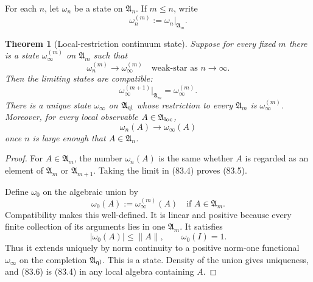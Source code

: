 \documentclass[11pt]{article}
\newtheorem{theorem}{Theorem}[section]
\theoremstyle{remark}
\begin{document}
For each \(n\), let \(\omega_n\) be a state on
\({\mathfrak A}_n\).  If \(m\leq n\), write
\[
                         \omega_n^{(m)}
 :=\omega_n|_{{\mathfrak A}_m}.                              \tag{83.3}
\]

\begin{theorem}[Local-restriction continuum state]
\label{thm:v12v83-local-limit}
Suppose for every fixed \(m\) there is a state
\(\omega_\infty^{(m)}\) on \({\mathfrak A}_m\) such that
\begin{equation}
                         \omega_n^{(m)}
 \longrightarrow\omega_\infty^{(m)}
 \quad\text{weak-star as }n\to\infty.                       \tag{83.4}
\end{equation}
Then the limiting states are compatible:
\begin{equation}
 \omega_\infty^{(m+1)}|_{{\mathfrak A}_m}
 =\omega_\infty^{(m)}.                                      \tag{83.5}
\end{equation}
There is a unique state \(\omega_\infty\) on
\({\mathfrak A}_{\rm ql}\) whose restriction to every
\({\mathfrak A}_m\) is \(\omega_\infty^{(m)}\).  Moreover, for every
local observable \(A\in{\mathfrak A}_{\rm loc}\),
\begin{equation}
                         \omega_n(A)\longrightarrow
                         \omega_\infty(A)                    \tag{83.6}
\end{equation}
once \(n\) is large enough that \(A\in{\mathfrak A}_n\).
\end{theorem}

\begin{proof}
For \(A\in{\mathfrak A}_m\), the number
\(\omega_n(A)\) is the same whether \(A\) is regarded as an element
of \({\mathfrak A}_m\) or \({\mathfrak A}_{m+1}\).  Taking the limit
in (83.4) proves (83.5).

Define \(\omega_0\) on the algebraic union by
\[
                         \omega_0(A):=\omega_\infty^{(m)}(A)
 \quad\text{if }A\in{\mathfrak A}_m.                        \tag{83.7}
\]
Compatibility makes this well-defined.  It is linear and positive
because every finite collection of its arguments lies in one
\({\mathfrak A}_m\).  It satisfies
\[
                         |\omega_0(A)|\leq\|A\|,\qquad
                         \omega_0(I)=1.                      \tag{83.8}
\]
Thus it extends uniquely by norm continuity to a positive
norm-one functional \(\omega_\infty\) on the completion
\({\mathfrak A}_{\rm ql}\).  This is a state.  Density of the union
gives uniqueness, and (83.6) is (83.4) in any local algebra
containing \(A\).
\end{proof}
\end{document}
